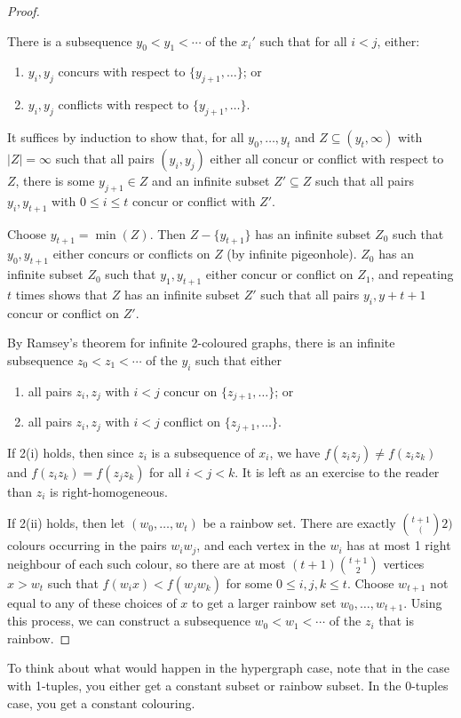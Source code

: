 \documentclass[main.tex]{subfiles}
\begin{document}
\begin{proof}
  \begin{claim*}
    There is a subsequence $y_0 < y_1 < \cdots$ of the $x_i'$ such that for all
    $i < j$, either:
    \begin{enumerate}
      \item $y_i,y_j$ concurs with respect to $\{y_{j+1},\ldots\}$; or
      \item $y_i,y_j$ conflicts with respect to $\{y_{j+1},\ldots\}$.
    \end{enumerate}
  \end{claim*}
  \begin{subproof}
    It suffices by induction to show that, for all $y_0,\ldots, y_t$ and
    $Z\subseteq (y_t,\infty)$ with $|Z| = \infty$ such that all pairs
    $(y_i,y_j)$ either all concur or conflict with respect to $Z$, there is
    some $y_{j+1}\in Z$ and an infinite subset $Z'\subseteq Z$ such that all
    pairs $y_i,y_{t+1}$ with $0\leq i\leq t$ concur or conflict with $Z'$.

    Choose $y_{t+1} = \min(Z)$.
    Then $Z - \{y_{t+1}\}$ has an infinite subset $Z_0$ such that $y_0, y_{t+1}$
    either concurs or conflicts on $Z$ (by infinite pigeonhole).
    $Z_0$ has an infinite subset $Z_0$ such that $y_1,y_{t+1}$ either concur or
    conflict on $Z_1$, and repeating $t$ times shows that $Z$ has an infinite
    subset $Z'$ such that all pairs $y_i,y+{t+1}$ concur or conflict on $Z'$.
  \end{subproof}
  By Ramsey's theorem for infinite 2-coloured graphs, there is an infinite
  subsequence $z_0 < z_1 < \cdots$ of the $y_i$ such that either
  \begin{enumerate}[label=2(\roman*)]
    \item all pairs $z_i,z_j$ with $i < j$ concur on $\{z_{j+1},\ldots\}$; or
    \item all pairs $z_i,z_j$ with $i< j$ conflict on $\{z_{j+1},\ldots\}$.
  \end{enumerate}
  If 2(i) holds, then since $z_i$ is a subsequence of $x_i$, we have
  $f(z_iz_j)\neq f(z_iz_k)$ and $f(z_iz_k) = f(z_jz_k)$ for all $i < j < k$.
  It is left as an exercise to the reader than $z_i$ is right-homogeneous.

  If 2(ii) holds, then let $(w_0,\ldots,w_t)$ be a rainbow set.
  There are exactly $\binom{t+1}(2)$ colours occurring in the pairs $w_iw_j$,
  and each vertex in the $w_i$ has at most 1 right neighbour of each such colour,
  so there are at most $(t+1)\binom{t+1}{2}$ vertices $x > w_t$ such that
  $f(w_ix) < f(w_jw_k)$ for some $0\leq i,j,k\leq t$.
  Choose $w_{t+1}$ not equal to any of these choices of $x$ to get a larger
  rainbow set $w_0,\ldots,w_{t+1}$.
  Using this process, we can construct a subsequence $w_0 < w_1 < \cdots$ of the
  $z_i$ that is rainbow.
\end{proof}
To think about what would happen in the hypergraph case, note that in the
case with 1-tuples, you either get a constant subset or rainbow subset.
In the 0-tuples case, you get a constant colouring.
\end{document}
